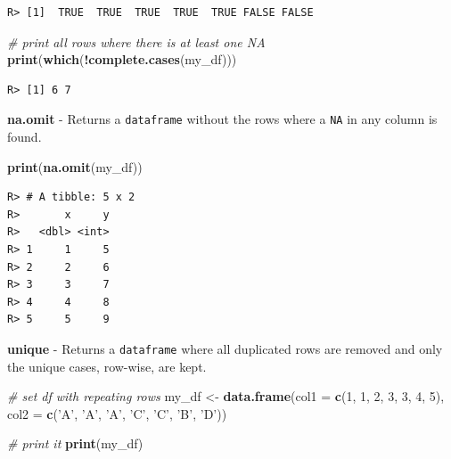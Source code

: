 \documentclass[
  12pt,
]{book}
\newenvironment{Shaded}{\begin{snugshade}}{\end{snugshade}}
\newcommand{\CommentTok}[1]{\textcolor[rgb]{0.37,0.37,0.37}{\textit{#1}}}
\newcommand{\DataTypeTok}[1]{\textcolor[rgb]{0.27,0.27,0.27}{#1}}
\newcommand{\DecValTok}[1]{\textcolor[rgb]{0.06,0.06,0.06}{#1}}
\newcommand{\KeywordTok}[1]{\textcolor[rgb]{0.27,0.27,0.27}{\textbf{#1}}}
\newcommand{\NormalTok}[1]{#1}
\newcommand{\OperatorTok}[1]{\textcolor[rgb]{0.43,0.43,0.43}{\textbf{#1}}}
\newcommand{\StringTok}[1]{\textcolor[rgb]{0.5,0.5,0.5}{#1}}
\begin{document}
\begin{verbatim}
R> [1]  TRUE  TRUE  TRUE  TRUE  TRUE FALSE FALSE
\end{verbatim}

\begin{Shaded}
\begin{Highlighting}[]
\CommentTok{# print all rows where there is at least one NA}
\KeywordTok{print}\NormalTok{(}\KeywordTok{which}\NormalTok{(}\OperatorTok{!}\KeywordTok{complete.cases}\NormalTok{(my_df)))}
\end{Highlighting}
\end{Shaded}

\begin{verbatim}
R> [1] 6 7
\end{verbatim}

\textbf{na.omit} - Returns a \texttt{dataframe} without the rows where a \texttt{NA} in any column is found. 

\begin{Shaded}
\begin{Highlighting}[]
\KeywordTok{print}\NormalTok{(}\KeywordTok{na.omit}\NormalTok{(my_df))}
\end{Highlighting}
\end{Shaded}

\begin{verbatim}
R> # A tibble: 5 x 2
R>       x     y
R>   <dbl> <int>
R> 1     1     5
R> 2     2     6
R> 3     3     7
R> 4     4     8
R> 5     5     9
\end{verbatim}

\textbf{unique} - Returns a \texttt{dataframe} where all duplicated rows are removed and only the unique cases, row-wise, are kept. 

\begin{Shaded}
\begin{Highlighting}[]
\CommentTok{# set df with repeating rows}
\NormalTok{my_df <-}\StringTok{ }\KeywordTok{data.frame}\NormalTok{(}\DataTypeTok{col1 =} \KeywordTok{c}\NormalTok{(}\DecValTok{1}\NormalTok{, }\DecValTok{1}\NormalTok{, }\DecValTok{2}\NormalTok{, }\DecValTok{3}\NormalTok{, }\DecValTok{3}\NormalTok{, }\DecValTok{4}\NormalTok{, }\DecValTok{5}\NormalTok{), }
                    \DataTypeTok{col2 =} \KeywordTok{c}\NormalTok{(}\StringTok{'A'}\NormalTok{, }\StringTok{'A'}\NormalTok{, }\StringTok{'A'}\NormalTok{, }\StringTok{'C'}\NormalTok{, }\StringTok{'C'}\NormalTok{, }\StringTok{'B'}\NormalTok{, }\StringTok{'D'}\NormalTok{))}

\CommentTok{# print it                  }
\KeywordTok{print}\NormalTok{(my_df)}
\end{Highlighting}
\end{Shaded}
\end{document}
